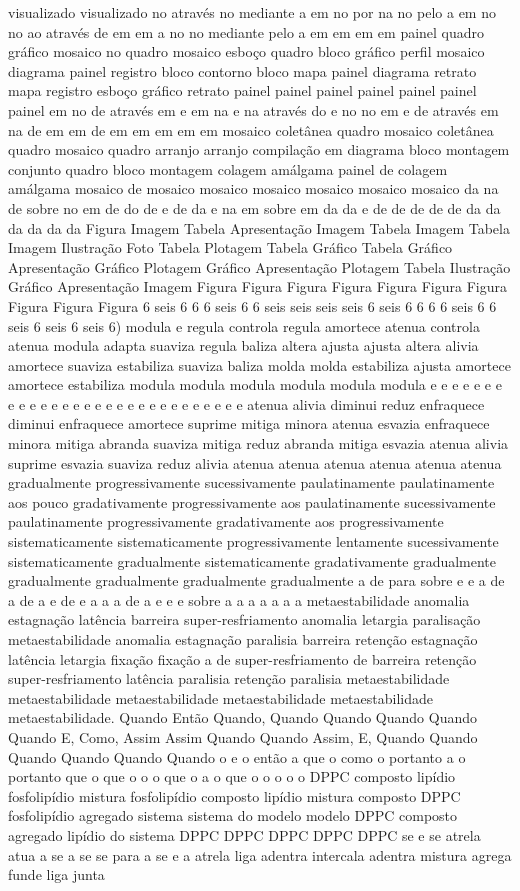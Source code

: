 visualizado visualizado no através no mediante a em no por na no pelo a em no no ao através de em em a no no mediante pelo a em em em em painel quadro gráfico mosaico no quadro mosaico esboço quadro bloco gráfico perfil mosaico diagrama painel registro bloco contorno bloco mapa painel diagrama retrato mapa registro esboço gráfico retrato painel painel painel painel painel painel painel em no de através em e em na e na através do e no no em e de através em na de em em de em em em em em mosaico coletânea quadro mosaico coletânea quadro mosaico quadro arranjo arranjo compilação em diagrama bloco montagem conjunto quadro bloco montagem colagem amálgama painel de colagem amálgama mosaico de mosaico mosaico mosaico mosaico mosaico mosaico da na de sobre no em de do de e de da e na em sobre em da da e de de de de de da da da da da da Figura Imagem Tabela Apresentação Imagem Tabela Imagem Tabela Imagem Ilustração Foto Tabela Plotagem Tabela Gráfico Tabela Gráfico Apresentação Gráfico Plotagem Gráfico Apresentação Plotagem Tabela Ilustração Gráfico Apresentação Imagem Figura Figura Figura Figura Figura Figura Figura Figura Figura Figura 6 seis 6 6 6 seis 6 6 seis seis seis seis 6 seis 6 6 6 6 seis 6 6 seis 6 seis 6 seis 6) modula e regula controla regula amortece atenua controla atenua modula adapta suaviza regula baliza altera ajusta ajusta altera alivia amortece suaviza estabiliza suaviza baliza molda molda estabiliza ajusta amortece amortece estabiliza modula modula modula modula modula modula e e e e e e e e e e e e e e e e e e e e e e e e e e e e e atenua alivia diminui reduz enfraquece diminui enfraquece amortece suprime mitiga minora atenua esvazia enfraquece minora mitiga abranda suaviza mitiga reduz abranda mitiga esvazia atenua alivia suprime esvazia suaviza reduz alivia atenua atenua atenua atenua atenua atenua gradualmente progressivamente sucessivamente paulatinamente paulatinamente aos pouco gradativamente progressivamente aos paulatinamente sucessivamente paulatinamente progressivamente gradativamente aos progressivamente sistematicamente sistematicamente progressivamente lentamente sucessivamente sistematicamente gradualmente sistematicamente gradativamente gradualmente gradualmente gradualmente gradualmente gradualmente a de para sobre e e a de a de a e de e a a a de a e e e sobre a a a a a a a metaestabilidade anomalia estagnação latência barreira super-resfriamento anomalia letargia paralisação metaestabilidade anomalia estagnação paralisia barreira retenção estagnação latência letargia fixação fixação a de super-resfriamento de barreira retenção super-resfriamento latência paralisia retenção paralisia metaestabilidade metaestabilidade metaestabilidade metaestabilidade metaestabilidade metaestabilidade. Quando Então Quando, Quando Quando Quando Quando Quando E, Como, Assim Assim Quando Quando Assim, E, Quando Quando Quando Quando Quando Quando o e o então a que o como o portanto a o portanto que o que o o o que o a o que o o o o o DPPC composto lipídio fosfolipídio mistura fosfolipídio composto lipídio mistura composto DPPC fosfolipídio agregado sistema sistema do modelo modelo DPPC composto agregado lipídio do sistema DPPC DPPC DPPC DPPC DPPC se e se atrela atua a se a se se para a se e a atrela liga adentra intercala adentra mistura agrega funde liga junta 